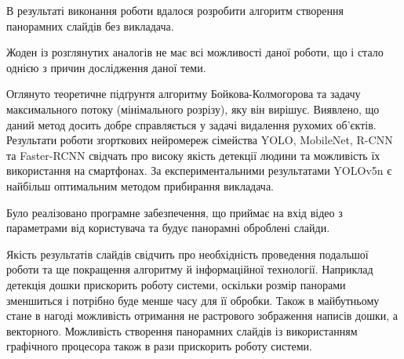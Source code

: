 В результаті виконання роботи вдалося
розробити алгоритм створення панорамних слайдів без викладача.


Жоден із розглянутих аналогів не має всі можливості даної роботи, що і стало однією
з причин дослідження даної теми.


Оглянуто теоретичне підґрунтя алгоритму Бойкова-Колмогорова та задачу
максимального потоку (мінімального розрізу), яку він вирішує. Виявлено, що
даний метод досить добре справляється у задачі видалення рухомих об'єктів.
Результати роботи згорткових нейромереж сімейства YOLO, MobileNet, R-CNN та
Faster-RCNN свідчать про високу якість детекції людини та можливість
їх використання на смартфонах. За експериментальними результатами YOLOv5n є найбільш оптимальним
методом прибирання викладача.


Було реалізовано програмне забезпечення,
що приймає на вхід відео з параметрами від користувача та
будує панорамні оброблені слайди.


Якість результатів слайдів свідчить про необхідність проведення подальшої роботи та
ще покращення алгоритму й інформаційної технології. Наприклад детекція дошки прискорить
роботу системи, оскільки розмір панорами зменшиться і потрібно буде менше часу для її обробки.
Також в майбутньому стане в нагоді можливість отримання не растрового зображення написів дошки, а
векторного. Можливість створення панорамних слайдів із використанням графічного процесора також 
в рази прискорить роботу системи. 
\clearpage